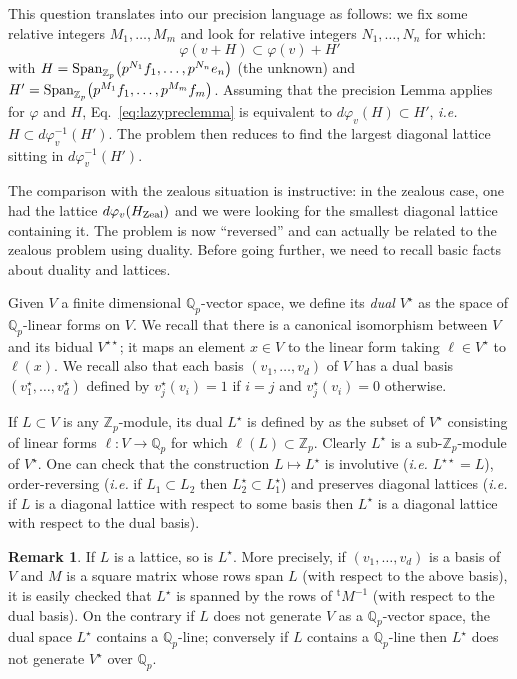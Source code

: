 \documentclass[11pt]{article}
\numberwithin{equation}{section}
\numberwithin{figure}{section}
\theoremstyle{definition}
\newtheorem{rem}[theo]{Remark}
\newcommand{\Z}{\mathbb Z}
\newcommand{\Zp}{\Z_p}
\newcommand{\Q}{\mathbb Q}
\newcommand{\Qp}{\Q_p}
\newcommand{\Span}{\text{\rm Span}}
\newcommand{\zealous}{\text{\rm Zeal}}
\begin{document}
This question translates into our precision language as follows: we fix 
some relative integers $M_1, \ldots, M_m$ and look for relative
integers $N_1, \ldots, N_n$ for which:
\begin{equation}
\label{eq:lazypreclemma}
\varphi(v + H) \subset \varphi(v) + H'
\end{equation}
with $H = \Span_{\Zp} \big(p^{N_1} f_1, \ldots, p^{N_n} e_n\big)$
(the unknown) and 
$H' = \Span_{\Zp} \big(p^{M_1} f_1, \ldots, p^{M_m} f_m\big)$.
Assuming that the precision Lemma applies for $\varphi$ and $H$, 
Eq.~\eqref{eq:lazypreclemma} is equivalent to $d\varphi_v(H) \subset H'$,
\emph{i.e.} $H \subset d\varphi_v^{-1}(H')$. The problem then reduces
to find the largest diagonal lattice sitting in $d\varphi_v^{-1}(H')$.

The comparison with the zealous situation is instructive: in the zealous 
case, one had the lattice $d \varphi_v(H_{\zealous})$ and we were 
looking for the smallest diagonal lattice containing it. The problem is
now ``reversed'' and can actually be related to the zealous problem
using duality. Before going further, we need to recall basic facts about
duality and lattices.

\medskip

Given $V$ a finite dimensional $\Qp$-vector space, we define its 
\emph{dual} $V^\star$ as the space of $\Qp$-linear forms on $V$. We
recall that there is a canonical isomorphism between $V$ and its
bidual $V^{\star\star}$; it maps an element $x \in V$ to the linear
form taking $\ell \in V^\star$ to $\ell(x)$. 
We recall also that each basis $(v_1, \ldots, v_d)$ of $V$ has a
dual basis $(v_1^\star, \ldots, v_d^\star)$ defined by $v_j^\star(v_i)
= 1$ if $i = j$ and $v_j^\star(v_i) = 0$ otherwise.

If $L \subset V$ is any $\Zp$-module, its dual $L^\star$ is defined by 
as the subset of $V^\star$ consisting of linear forms $\ell : V \to \Qp$ 
for which $\ell(L) \subset \Zp$. Clearly $L^\star$ is a sub-$\Zp$-module 
of $V^\star$. One can check that the construction $L \mapsto L^\star$ is 
involutive (\emph{i.e.} $L^{\star\star} = L$), order-reversing 
(\emph{i.e.} if $L_1 \subset L_2$ then $L_2^\star \subset L_1^\star$) 
and preserves diagonal lattices (\emph{i.e.} if $L$ is a diagonal 
lattice with respect to some basis then $L^\star$ is a diagonal lattice 
with respect to the dual basis).

\begin{rem}
\label{rem:duallattice}
If $L$ is a lattice, so is $L^\star$. More precisely, if
$(v_1, \ldots, v_d)$ is a basis of $V$ and $M$ is a square matrix whose 
rows span $L$ (with respect to the above basis), it is easily checked 
that $L^\star$ is spanned by the rows of ${}^{\text{t}}\! M^{-1}$ (with 
respect to the dual basis). On the contrary if $L$ does not generate 
$V$ as a $\Qp$-vector space, the dual space $L^\star$ contains a
$\Qp$-line; conversely if $L$ contains a $\Qp$-line then $L^\star$
does not generate $V^\star$ over $\Qp$.
\end{rem}
\end{document}
